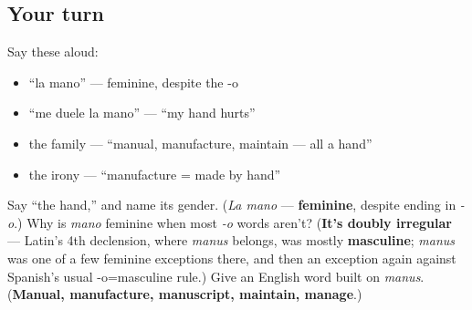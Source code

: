 \subsection*{Your turn}
Say these aloud:

\begin{itemize}
\raggedright
  \item \textquotedblleft{}la mano\textquotedblright{} — feminine, despite the -o
  \item \textquotedblleft{}me duele la mano\textquotedblright{} — \textquotedblleft{}my hand hurts\textquotedblright{}
  \item the family — \textquotedblleft{}manual, manufacture, maintain — all a hand\textquotedblright{}
  \item the irony — \textquotedblleft{}manufacture = made by hand\textquotedblright{}
\end{itemize}

\begin{tcolorbox}[breakable,colback=teal!4,colframe=teal!35!black,title={Before you move on}]
Say \textquotedblleft{}the hand,\textquotedblright{} and name its gender. (\emph{La mano} — \textbf{feminine}, despite ending in \emph{-o}.) Why is \emph{mano} feminine when most \emph{-o} words aren't? (\textbf{It's doubly irregular} — Latin's 4th declension, where \emph{manus} belongs, was mostly \textbf{masculine}; \emph{manus} was one of a few feminine exceptions there, and then an exception again against Spanish's usual -o=masculine rule.) Give an English word built on \emph{manus}. (\textbf{Manual, manufacture, manuscript, maintain, manage}.)
\end{tcolorbox}
